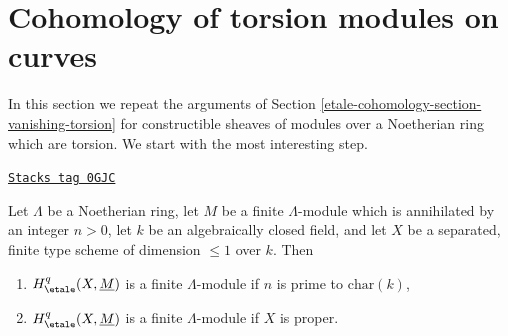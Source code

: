 \section{Cohomology of torsion modules on curves}
\label{etale-cohomology-section-vanishing-torsion-coefficients}
In this section we repeat the arguments of
Section \ref{etale-cohomology-section-vanishing-torsion}
for constructible sheaves of modules over a Noetherian ring
which are torsion. We start with the most interesting step.

\begin{lemma}
\label{etale-cohomology-lemma-constant-statements-coefficients}
\href{https://stacks.math.columbia.edu/tag/0GJC}{\texttt{Stacks tag 0GJC}}

Let $\Lambda$ be a Noetherian ring, let $M$ be a finite $\Lambda$-module which
is annihilated by an integer $n > 0$, let $k$ be an algebraically closed field,
and let $X$ be a separated, finite type scheme of dimension $\leq 1$ over $k$.
Then
\begin{enumerate}
\item $H^q_\etale(X, \underline{M})$ is a finite $\Lambda$-module
if $n$ is prime to $\text{char}(k)$,
\item $H^q_\etale(X, \underline{M})$ is a finite $\Lambda$-module
if $X$ is proper.
\end{enumerate}
\end{lemma}

